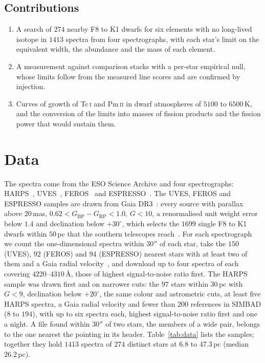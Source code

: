 \documentclass[3p,11pt]{elsarticle}
\newcommand{\ion}[2]{#1\,\textsc{#2}}
\begin{document}
\subsection{Contributions}
\begin{enumerate}[leftmargin=*,itemsep=1pt]
\item A search of $274$ nearby F8 to K1 dwarfs for six elements with no long-lived
isotope in $1413$ spectra from four spectrographs, with each star's limit on the
equivalent width, the abundance and the mass of each element.
\item A measurement against comparison stacks with a per-star empirical null, whose
limits follow from the measured line scores and are confirmed by injection.
\item Curves of growth of \ion{Tc}{i} and \ion{Pm}{ii} in dwarf atmospheres of
$5100$ to $6500$\,K, and the conversion of the limits into masses of fission products
and the fission power that would sustain them.
\end{enumerate}

\section{Data}\label{sec:data}

The spectra come from the ESO Science Archive and four spectrographs:
HARPS~\cite{Mayor2003}, UVES~\cite{Dekker2000}, FEROS~\cite{Kaufer1999} and
ESPRESSO~\cite{Pepe2021}. The UVES, FEROS and ESPRESSO samples are drawn from Gaia
DR3~\cite{Gaia2023}: every source with parallax above $20$\,mas,
$0.62<G_\mathrm{BP}-G_\mathrm{RP}<1.0$, $G<10$, a renormalised unit weight error below
$1.4$ and declination below $+30^\circ$, which selects the $1699$ single F8 to K1 dwarfs
within $50$\,pc that the southern telescopes reach~\cite{PecautMamajek2013}. For each
spectrograph we count the one-dimensional spectra within $30''$ of each star, take the
$150$ (UVES), $92$ (FEROS) and $94$ (ESPRESSO) nearest stars with at least two of them
and a Gaia radial velocity~\cite{Katz2023}, and download up to four spectra of each
covering $4220$--$4310$\,\AA, those of highest signal-to-noise ratio first. The HARPS
sample was drawn first and on narrower cuts: the $97$ stars within $30$\,pc with
$G<9$, declination below $+20^\circ$, the same colour and astrometric cuts, at least five
HARPS spectra, a Gaia radial velocity and fewer than $200$ references in SIMBAD ($8$ to
$194$), with up to six spectra each, highest signal-to-noise ratio first and one a night.
A file found within $30''$ of two stars, the members of a wide pair, belongs to the one
nearest the pointing in its header. Table~\ref{tab:data} lists the samples; together they
hold $1413$ spectra of $274$ distinct stars at $6.8$ to $47.3$\,pc (median $26.2$\,pc).
\end{document}
